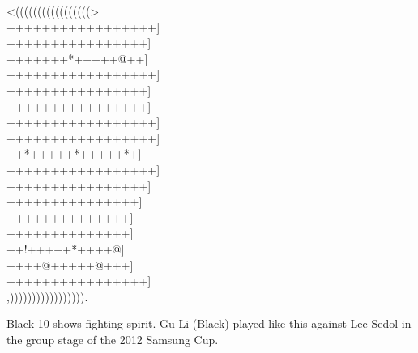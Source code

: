 \documentclass[10pt]{article}
\begin{document}
\begin{minipage}[t]{0.6\textwidth}
\gnos
<(((((((((((((((((>\\
+++++++++++++++++]\\
++++++++++++++++]\\
+++++++*+++++@++]\\
+++++++++++++++++]\\
++++++++++++++++]\\
++++++++++++++++]\\
+++++++++++++++++]\\
+++++++++++++++++]\\
++*+++++*+++++*+]\\
+++++++++++++++++]\\
++++++++++++++++]\\
+++++++++++++++]\\
++++++++++++++]\\
++++++++++++++]\\
++!+++++*++++@]\\
++++@+++++@+++]\\
++++++++++++++++]\\
,))))))))))))))))).\\
\end{minipage}
\begin{minipage}[t]{0.4\textwidth}
\setlength{\parskip}{0.5em}
Black 10 shows fighting spirit. Gu Li (Black) played like this against Lee Sedol in the group stage of the 2012 Samsung Cup.
\end{minipage}
\end{document}

